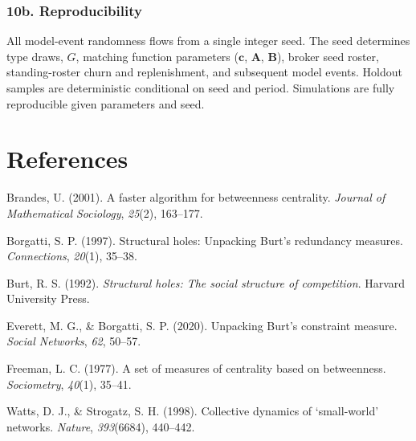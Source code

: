 \documentclass[11pt]{article}
\begin{document}
\subsubsection{10b. Reproducibility}\label{b.-reproducibility}

All model-event randomness flows from a single integer seed. The seed determines type draws, \(G\), matching function parameters (\(\mathbf{c}\), \(\mathbf{A}\), \(\mathbf{B}\)), broker seed roster, standing-roster churn and replenishment, and subsequent model events. Holdout samples are deterministic conditional on seed and period. Simulations are fully reproducible given parameters and seed.

\section{References}\label{references}

Brandes, U. (2001). A faster algorithm for betweenness centrality. \emph{Journal of Mathematical Sociology}, \emph{25}(2), 163--177.

Borgatti, S. P. (1997). Structural holes: Unpacking Burt's redundancy measures. \emph{Connections}, \emph{20}(1), 35--38.

Burt, R. S. (1992). \emph{Structural holes: The social structure of competition}. Harvard University Press.

Everett, M. G., \& Borgatti, S. P. (2020). Unpacking Burt's constraint measure. \emph{Social Networks}, \emph{62}, 50--57.

Freeman, L. C. (1977). A set of measures of centrality based on betweenness. \emph{Sociometry}, \emph{40}(1), 35--41.

Watts, D. J., \& Strogatz, S. H. (1998). Collective dynamics of `small-world' networks. \emph{Nature}, \emph{393}(6684), 440--442.
\end{document}
